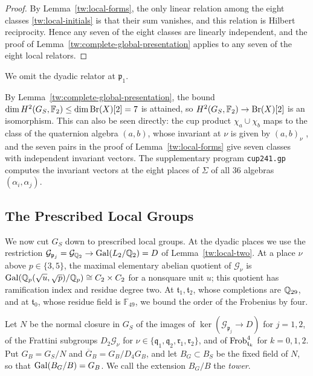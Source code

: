 \begin{proof}
By Lemma~\ref{tw:local-forms}, the only linear relation among the eight
classes \eqref{tw:local-initials} is that their sum vanishes, and this
relation is Hilbert reciprocity. Hence any seven of the eight classes are
linearly independent, and the proof of
Lemma~\ref{tw:complete-global-presentation} applies to any seven of the eight
local relators.
\end{proof}

We omit the dyadic relator at $\mathfrak p_1$.

\begin{remark}\label{tw:cup-remark}
By Lemma~\ref{tw:complete-global-presentation}, the bound
$\dim H^2(G_S,\mathbb F_2)\le\dim\operatorname{Br}(X)[2]=7$ is attained, so
$H^2(G_S,\mathbb F_2)\to\operatorname{Br}(X)[2]$ is an isomorphism. This can also be seen
directly: the cup product
$\chi_a\cup\chi_b$ maps to the class of the quaternion algebra $(a,b)$, whose
invariant at $\nu$ is given by $(a,b)_\nu$ \cite[Chapter~III,
Remark~4.7]{MilneCFT}, and the seven pairs in the proof of
Lemma~\ref{tw:local-forms} give seven classes with independent invariant
vectors. The supplementary program \texttt{cup241.gp} computes the invariant
vectors at the eight places of $\Sigma$ of all $36$ algebras
$(\alpha_i,\alpha_j)$.
\end{remark}

\subsection{The Prescribed Local Groups}\label{tw:prescribed-section}
We now cut $G_S$ down to prescribed local groups. At the dyadic
places we use the restriction
$\mathcal G_{\mathfrak p_j}=\mathcal G_{\mathbb Q_2}\to\operatorname{Gal}(L_2/\mathbb Q_2)=D$ of
Lemma~\ref{tw:local-two}. At a place $\nu$ above $p\in\{3,5\}$, the maximal
elementary abelian quotient of $\mathcal G_\nu$ is
$\operatorname{Gal}(\mathbb Q_p(\sqrt u,\sqrt p)/\mathbb Q_p)\cong C_2\times C_2$ for a nonsquare unit $u$;
this quotient has ramification index and residue degree two. At
$\mathfrak t_1,\mathfrak t_2$, whose completions are $\mathbb Q_{29}$, and at
$\mathfrak t_0$, whose residue field is $\mathbb F_{49}$, we bound the order
of the Frobenius by four.

\begin{definition}\label{tw:GB}
Let $N$ be the normal closure in $G_S$ of the images of
$\ker(\mathcal G_{\mathfrak p_j}\to D)$ for $j=1,2$, of the Frattini subgroups
$D_2\mathcal G_\nu$ for $\nu\in\{\mathfrak q_1,\mathfrak q_2,\mathfrak r_1,\mathfrak r_2\}$,
and of $\operatorname{Frob}_{\mathfrak t_k}^4$ for $k=0,1,2$. Put $G_B=G_S/N$ and
$\overline G_B=G_B/D_4G_B$, and let $B_G\subset B_S$ be the fixed field of
$N$, so that $\operatorname{Gal}(B_G/B)=G_B$. We call the extension $B_G/B$ the
\emph{tower}.
\end{definition}

